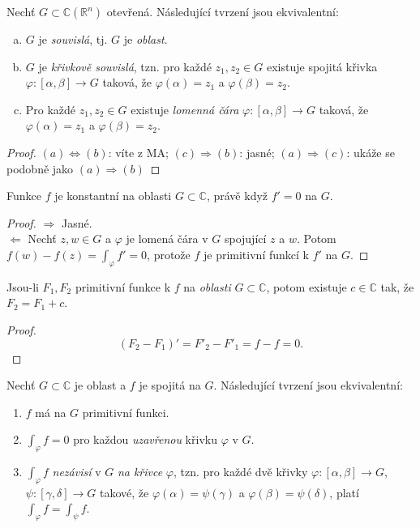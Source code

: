 \begin{reminder}[Souvislost]
Nechť $G\subset\mathbb{C}(\mathbb{R}^n)$ otevřená. Následující tvrzení jsou ekvivalentní:

\begin{enumerate}[(a)]
    \item $G$ je \emph{souvislá}, tj. $G$ je \emph{oblast}.
    \item $G$ je \emph{křivkově souvislá}, tzn. pro každé $z_1,z_2\in G$ existuje spojitá křivka $\varphi:[\alpha,\beta]\rightarrow G$ taková, že $\varphi(\alpha)=z_1$ a $\varphi(\beta)=z_2$.
    \item Pro každé $z_1,z_2\in G$ existuje \emph{lomenná čára} $\varphi:[\alpha,\beta]\rightarrow G$ taková, že $\varphi(\alpha)=z_1$ a $\varphi(\beta)=z_2$.
\end{enumerate}
\end{reminder}
\begin{proof}
$(a)\iff (b)$: víte z MA; $(c)\Rightarrow(b)$: jasné; $(a)\Rightarrow(c)$: ukáže se podobně jako $(a)\Rightarrow (b)$
\end{proof}

\begin{theorem}
Funkce $f$ je konstantní na oblasti $G\subset\mathbb{C}$, právě když $f'=0$ na $G$.
\end{theorem}
\begin{proof}
$\Rightarrow$ Jasné.\\
$\Leftarrow$ Nechť $z,w\in G$ a $\varphi$ je lomená čára v $G$ spojující $z$ a $w$. Potom $f(w)-f(z)=\int_\varphi f'=0$, protože $f$ je primitivní funkcí k $f'$ na $G$.
\end{proof}

\begin{consequence}
Jsou-li $F_1,F_2$ primitivní funkce k $f$ na \emph{oblasti} $G\subset\mathbb{C}$, potom existuje $c\in\mathbb{C}$ tak, že $F_2=F_1+c$.
\end{consequence}

\begin{proof}
$$(F_2-F_1)'=F'_2-F'_1=f-f=0\text{.}$$
\end{proof}

\begin{theorem}[O existenci PF]\label{thm:oExistenciPF}
Nechť $G\subset\mathbb{C}$ je oblast a $f$ je spojitá na $G$. Následující tvrzení jsou ekvivalentní:
\begin{enumerate}
    \item $f$ má na $G$ primitivní funkci.
    \item $\int_\varphi f=0$ pro každou \emph{uzavřenou} křivku $\varphi$ v $G$.
    \item $\int_\varphi f$ \emph{nezávisí} v $G$ \emph{na křivce} $\varphi$, tzn. pro každé dvě křivky $\varphi:[\alpha,\beta]\rightarrow G$, $\psi:[\gamma,\delta]\rightarrow G$ takové, že $\varphi(\alpha)=\psi(\gamma)$ a $\varphi(\beta)=\psi(\delta)$, platí $\int_\varphi f = \int_\psi f$.%
\end{enumerate}
\end{theorem}

